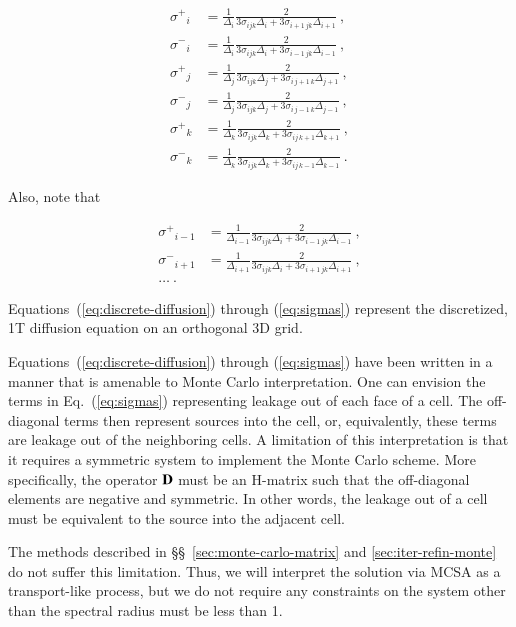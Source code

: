 \documentclass[preprint,12pt]{elsarticle}
\newcommand{\Di}{\ensuremath{\Delta_i}}
\newcommand{\Dj}{\ensuremath{\Delta_j}}
\newcommand{\Dk}{\ensuremath{\Delta_k}}
\newcommand{\sigm}{\ensuremath{\sigma^{-}}}
\newcommand{\sigp}{\ensuremath{\sigma^{+}}}
\begin{document}
\begin{subequations}
  \begin{align}
    \sigp_{i} &= \frac{1}{\Di}\frac{2}{3\sigma_{ijk}\Di +
      3\sigma_{i+1\,jk}\Delta_{i+1}}\:,\\ \sigm_{i} &=
    \frac{1}{\Di}\frac{2}{3\sigma_{ijk}\Di +
      3\sigma_{i-1\,jk}\Delta_{i-1}}\:,\\ \sigp_{j} &=
    \frac{1}{\Dj}\frac{2}{3\sigma_{ijk}\Dj +
      3\sigma_{i\,j+1\,k}\Delta_{j+1}}\:,\\ \sigm_{j} &=
    \frac{1}{\Dj}\frac{2}{3\sigma_{ijk}\Dj +
      3\sigma_{i\,j-1\,k}\Delta_{j-1}}\:,\\ \sigp_{k} &=
    \frac{1}{\Dk}\frac{2}{3\sigma_{ijk}\Dk +
      3\sigma_{ij\,k+1}\Delta_{k+1}}\:,\\ \sigm_{k} &=
    \frac{1}{\Dk}\frac{2}{3\sigma_{ijk}\Dk +
      3\sigma_{ij\,k-1}\Delta_{k-1}}\:.
  \end{align}
  \label{eq:sigmas}
\end{subequations}

Also, note that

\begin{align*}
  \sigp_{i-1} &= \frac{1}{\Delta_{i-1}}\frac{2}{3\sigma_{ijk}\Di +
    3\sigma_{i-1\,jk}\Delta_{i-1}}\:,\\ \sigm_{i+1} &=
  \frac{1}{\Delta_{i+1}}\frac{2}{3\sigma_{ijk}\Di +
    3\sigma_{i+1\,jk}\Delta_{i+1}}\:,\\ \ldots\:.
\end{align*}

Equations~(\ref{eq:discrete-diffusion}) through (\ref{eq:sigmas})
represent the discretized, 1T diffusion equation on an orthogonal 3D
grid.

Equations~(\ref{eq:discrete-diffusion}) through (\ref{eq:sigmas}) have
been written in a manner that is amenable to Monte Carlo
interpretation.  One can envision the terms in Eq.~(\ref{eq:sigmas})
representing leakage out of each face of a cell.  The off-diagonal
terms then represent sources into the cell, or, equivalently, these
terms are leakage out of the neighboring cells.  A limitation of this
interpretation is that it requires a symmetric system to implement the
Monte Carlo scheme.  More specifically, the operator $\mathbf{D}$ must be
an H-matrix \cite{kelley_1995} such that the off-diagonal elements are
negative and symmetric.  In other words, the leakage out of a cell
must be equivalent to the source into the adjacent cell.

The methods described in \S\S~\ref{sec:monte-carlo-matrix} and
\ref{sec:iter-refin-monte} do not suffer this limitation.  Thus, we
will interpret the solution via MCSA as a transport-like process, but
we do not require any constraints on the system other than the
spectral radius must be less than 1.
\end{document}

